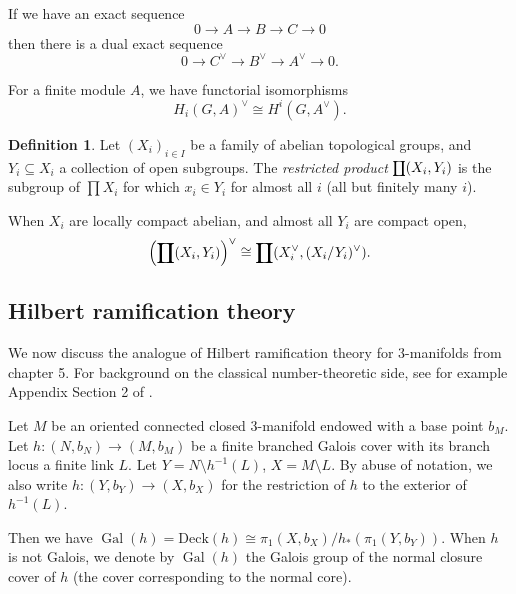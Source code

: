 \documentclass{amsart}
\theoremstyle{plain}
\theoremstyle{definition}
\newtheorem{Def}[theorem]{Definition}
\theoremstyle{plain}
\theoremstyle{plain}
\theoremstyle{plain}
\theoremstyle{remark}
\theoremstyle{remark}
\theoremstyle{plain}
\theoremstyle{definition}
\theoremstyle{plain}
\DeclareMathOperator{\Gal}{\mathrm{Gal}}
\theoremstyle{plain}
\theoremstyle{plain}
\def\doubleprod#1#2{\ooalign{$#1\prod$\cr$#1\coprod$\cr}}
\DeclareMathOperator*{\Rprod}{\mathpalette\doubleprod\relax}
\numberwithin{equation}{section}
\begin{document}
If we have an exact sequence 
\begin{equation}
    0\to A\to B\to C\to 0
\end{equation}
then there is a dual exact sequence
\begin{equation}\label{eq:pontDual}
    0\to C^\vee\to B^\vee\to A^\vee\to 0.
\end{equation}

For a finite module $A$, we have functorial isomorphisms 
\begin{equation}
    H_i(G,A)^\vee\cong H^i(G,A^\vee).
\end{equation}
\begin{Def}
Let $(X_i)_{i\in I}$ be a family of abelian topological groups, and $Y_i\subseteq X_i$ a collection of open subgroups. The \emph{restricted product} $\Rprod(X_i,Y_i)$ is the subgroup of $\prod X_i$ for which $x_i\in Y_i$ for almost all $i$ (all but finitely many $i$).
\end{Def}

When $X_i$ are locally compact abelian, and almost all $Y_i$ are compact open, 
\begin{equation}\label{eq:resprodDuality}
    \left(\Rprod(X_i,Y_i)\right)^\vee \cong \Rprod(X_i^\vee,(X_i/Y_i)^\vee).
\end{equation}

\subsection{Hilbert ramification theory}

We now discuss the analogue of Hilbert ramification theory for 3-manifolds from \cite{morishita2012knots} chapter 5. For background on the classical number-theoretic side, see for example Appendix Section 2 of \cite{washington}. 

\medskip

Let $M$ be an oriented connected closed 3-manifold endowed with a base point $b_M$. Let $h: (N, b_N) \to (M, b_M)$ be a finite branched Galois cover with its branch locus a finite link $L$. Let $Y = N \setminus h^{-1}(L)$, $X = M \setminus L$. By abuse of notation, we also write $h: (Y, b_Y) \to (X, b_X)$ for the restriction of $h$ to the exterior of $h^{-1}(L)$. 

\medskip

 Then we have $\Gal(h) = \text{Deck}(h) \cong \pi_1(X, b_X) / h_*(\pi_1(Y, b_Y))$. When $h$ is not Galois, we denote by $\Gal(h)$ the Galois group of the normal closure cover of $h$ (the cover corresponding to the normal core). 
\end{document}

